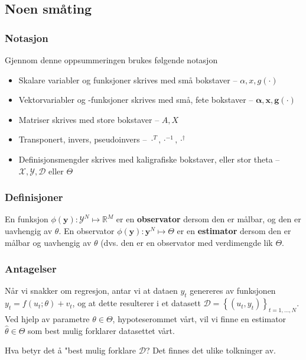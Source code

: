 \subsection{Noen småting}
\subsubsection{Notasjon}
Gjennom denne oppsummeringen brukes følgende notasjon
\begin{itemize}
\item Skalare variabler og funksjoner skrives med små bokstaver -- $\alpha, x, g(\cdot)$
\item Vektorvariabler og -funksjoner skrives med små, fete bokstaver -- $\mathbf{\alpha}, \mathbf{x}, \mathbf{g(\cdot)}$
\item Matriser skrives med store bokstaver -- $A, X$
\item Transponert, invers, pseudoinvers -- $\cdot^T, \cdot^{-1}, \cdot^\dagger$
\item Definisjonsmengder skrives med kaligrafiske bokstaver, eller stor theta -- $\mathcal{X}, \mathcal{Y}, \mathcal{D}$ eller $\Theta$
\end{itemize}

\subsubsection{Definisjoner}
En funksjon \(\phi(\boldsymbol{y}): \mathcal{Y}^{N} \mapsto \mathbb{R}^{M}\) er en \textbf{observator} dersom den er målbar, og den er uavhengig av $\theta$. En observator \(\phi(\boldsymbol{y}): \boldsymbol{y}^{N} \mapsto \Theta\) er en \textbf{estimator} dersom den er målbar og uavhengig av $\theta$ (dvs. den er en observator med verdimengde lik $\Theta$.

\subsubsection{Antagelser}
Når vi snakker om regresjon, antar vi at dataen $y_t$ genereres av funksjonen \(y_{t}=f\left(u_{t} ; \theta\right)+v_{t}\), og at dette resulterer i et datasett \(\mathcal{D}=\left\{\left(u_{t}, y_{t}\right)\right\}_{t=1, \ldots, N}\). Ved hjelp av parametre \(\theta \in \Theta\), hypoteserommet vårt, vil vi finne en estimator \(\widehat{\theta} \in \Theta\) som best mulig forklarer datasettet vårt.

Hva betyr det å "best mulig forklare $\mathcal{D}$? Det finnes det ulike tolkninger av.